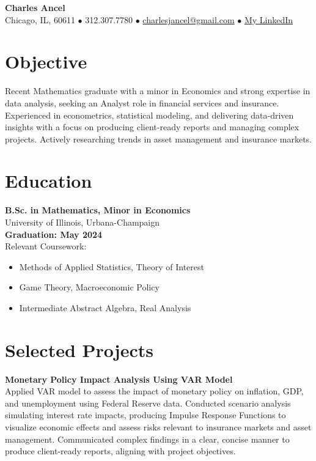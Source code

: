 \documentclass[10pt]{article}
\begin{document}
\begin{center}
{\Large\textbf{Charles Ancel}}\\
\vspace{5pt}
\small{Chicago, IL, 60611 \(\bullet\) 312.307.7780 \(\bullet\) \href{mailto:charlesjancel@gmail.com}{charlesjancel@gmail.com} \(\bullet\) \href{https://www.linkedin.com/in/charles-j-ancel/}{My LinkedIn}}
\end{center}
\vspace{-10pt}

\section*{Objective}
\vspace{0pt}
Recent Mathematics graduate with a minor in Economics and strong expertise in data analysis, seeking an Analyst role in financial services and insurance. Experienced in econometrics, statistical modeling, and delivering data-driven insights with a focus on producing client-ready reports and managing complex projects. Actively researching trends in asset management and insurance markets.

\vspace{-10pt}
\section*{Education}
\vspace{-20pt}
\begin{multicols}{2}
\textbf{B.Sc. in Mathematics, Minor in Economics} \\
University of Illinois, Urbana-Champaign \\
\textbf{Graduation: May 2024} \\

Relevant Coursework:
\begin{itemize}[noitemsep,nosep]
    \item Methods of Applied Statistics, Theory of Interest
    \item Game Theory, Macroeconomic Policy
    \item Intermediate Abstract Algebra, Real Analysis
\end{itemize}
\end{multicols}

\vspace{-20pt}
\section*{Selected Projects}
\vspace{0pt}
\textbf{Monetary Policy Impact Analysis Using VAR Model} \\
Applied VAR model to assess the impact of monetary policy on inflation, GDP, and unemployment using Federal Reserve data. Conducted scenario analysis simulating interest rate impacts, producing Impulse Response Functions to visualize economic effects and assess risks relevant to insurance markets and asset management. Communicated complex findings in a clear, concise manner to produce client-ready reports, aligning with project objectives.
\end{document}
